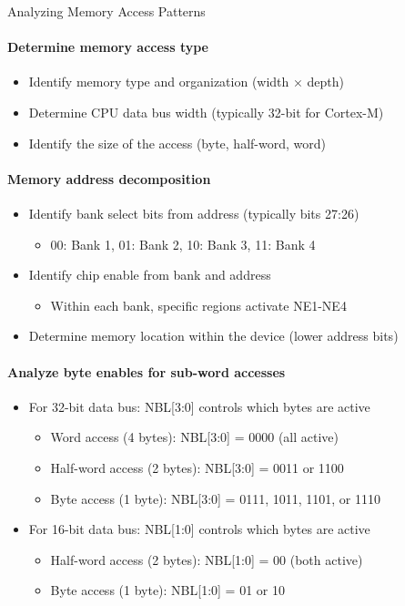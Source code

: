 \begin{KR}{Analyzing Memory Access Patterns}\\
\paragraph{Determine memory access type}
\begin{itemize}
    \item Identify memory type and organization (width × depth)
    \item Determine CPU data bus width (typically 32-bit for Cortex-M)
    \item Identify the size of the access (byte, half-word, word)
\end{itemize}

\paragraph{Memory address decomposition}
\begin{itemize}
    \item Identify bank select bits from address (typically bits 27:26)
    \begin{itemize}
        \item 00: Bank 1, 01: Bank 2, 10: Bank 3, 11: Bank 4
    \end{itemize}
    \item Identify chip enable from bank and address
    \begin{itemize}
        \item Within each bank, specific regions activate NE1-NE4
    \end{itemize}
    \item Determine memory location within the device (lower address bits)
\end{itemize}

\paragraph{Analyze byte enables for sub-word accesses}
\begin{itemize}
    \item For 32-bit data bus: NBL[3:0] controls which bytes are active
    \begin{itemize}
        \item Word access (4 bytes): NBL[3:0] = 0000 (all active)
        \item Half-word access (2 bytes): NBL[3:0] = 0011 or 1100
        \item Byte access (1 byte): NBL[3:0] = 0111, 1011, 1101, or 1110
    \end{itemize}
    \item For 16-bit data bus: NBL[1:0] controls which bytes are active
    \begin{itemize}
        \item Half-word access (2 bytes): NBL[1:0] = 00 (both active)
        \item Byte access (1 byte): NBL[1:0] = 01 or 10
    \end{itemize}
\end{itemize}


\end{KR}
